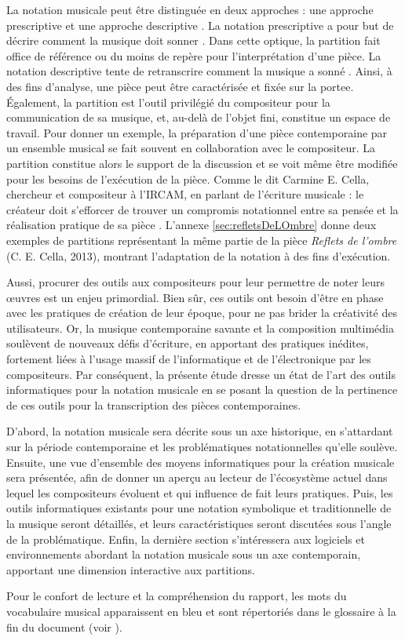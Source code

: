La notation musicale peut être distinguée en deux approches : une approche prescriptive et une approche descriptive \cite{battier2015}.
La notation prescriptive a pour but de décrire \og comment la musique doit sonner \fg.
Dans cette optique, la partition fait office de référence ou du moins de repère pour l'interprétation d'une pièce. 
La notation descriptive tente de retranscrire \og comment la musique a sonné \fg.
Ainsi, à des fins d'analyse, une pièce peut être caractérisée et fixée sur la \gls{portee}.
Également, la partition est l'outil privilégié du compositeur pour la communication de sa musique, et, au-delà de l'objet fini, constitue un espace de travail.
Pour donner un exemple, la préparation d'une pièce contemporaine par un ensemble musical se fait souvent en collaboration avec le compositeur. La partition constitue alors le support de la discussion et se voit même être modifiée pour les besoins de l'exécution de la pièce. Comme le dit Carmine E. Cella, chercheur et compositeur à l'IRCAM, en parlant de l'écriture musicale : \og le créateur doit s'efforcer de trouver un compromis notationnel entre sa pensée et la réalisation pratique de sa pièce \fg. L'annexe \ref{sec:refletsDeLOmbre} donne deux exemples de partitions représentant la même partie de la pièce \textit{Reflets de l'ombre} (C. E. Cella, 2013), montrant l'adaptation de la notation à des fins d'exécution.

Aussi, procurer des outils aux compositeurs pour leur permettre de noter leurs œuvres est un enjeu primordial. Bien sûr, ces outils ont besoin d'être en phase avec les pratiques de création de leur époque, pour ne pas brider la créativité des utilisateurs.
Or, la musique contemporaine savante et la composition multimédia soulèvent de nouveaux défis d'écriture, en apportant des pratiques inédites, fortement liées à l'usage massif de l'informatique et de l'électronique par les compositeurs. Par conséquent, la présente étude dresse un état de l'art des outils informatiques pour la notation musicale en se posant la question de la pertinence de ces outils pour la transcription des pièces contemporaines.

D'abord, la notation musicale sera décrite sous un axe historique, en s'attardant sur la période  contemporaine et les problématiques notationnelles qu'elle soulève. Ensuite, une vue d'ensemble des moyens informatiques pour la création musicale sera présentée, afin de donner un aperçu au lecteur de l'écosystème actuel dans lequel les compositeurs évoluent et qui influence de fait leurs pratiques. Puis, les outils informatiques existants pour une notation symbolique et traditionnelle de la musique seront détaillés, et leurs caractéristiques seront discutées sous l'angle de la problématique. Enfin, la dernière section s'intéressera aux logiciels et environnements abordant la notation musicale sous un axe contemporain, apportant une dimension interactive aux partitions.

Pour le confort de lecture et la compréhension du rapport, les mots du vocabulaire musical apparaissent en bleu et sont répertoriés dans le glossaire à la fin du document (voir ).



